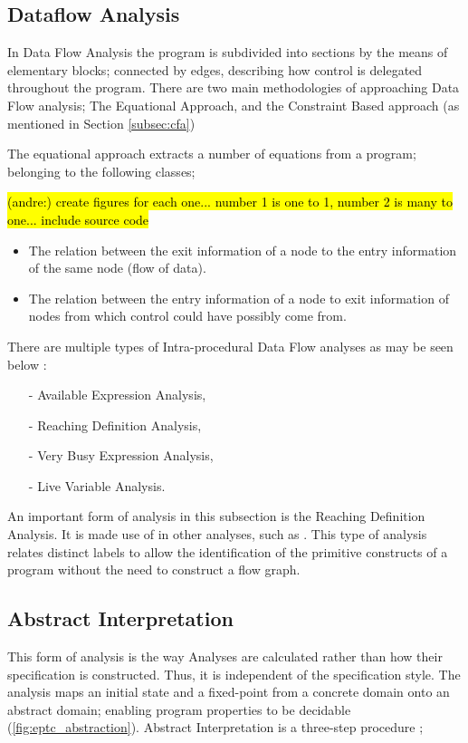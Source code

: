 \documentclass[12pt, a4paper]{report}
\DeclareRobustCommand{\andre}[1]{ {\begingroup\sethlcolor{BurntOrange}\hl{(andre:) #1}\endgroup} }
\theoremstyle{definition}
\theoremstyle{definition}%
\theoremstyle{definition}%
\theoremstyle{definition}%
\theoremstyle{definition}%
\theoremstyle{definition}%
\begin{document}
{    \subsection{Dataflow Analysis}
    \par In Data Flow Analysis the program is subdivided into sections by the means of elementary blocks; connected by edges, describing how control is delegated throughout the program.
    There are two main methodologies of approaching Data Flow analysis; The Equational Approach, and the Constraint Based approach (as mentioned in Section \ref{subsec:cfa})
    \par The equational approach extracts a number of equations from a program; belonging to the following classes;
    
    \par \andre{create figures for each one... number 1 is one to 1, number 2 is many to one... include source code}
    \begin{itemize}
        \item The relation between the exit information of a node to the entry information of the same node (flow of data).
        \item The relation between the entry information of a node to exit information of nodes from which control could have possibly come from. 
    \end{itemize}

    \par There are multiple types of Intra-procedural Data Flow analyses as may be seen below \cite[pp.33--51]{nielson2004principlesofPA}:
    \begin{itemize}
        \item[-] Available Expression Analysis,
        \item[-] Reaching Definition Analysis,
        \item[-] Very Busy Expression Analysis,
        \item[-] Live Variable Analysis.
    \end{itemize}

    \par An important form of analysis in this subsection is the Reaching Definition Analysis. It is made use of in other analyses, such as .
    This type of analysis relates distinct labels to allow the identification of the primitive constructs of a program without the need to construct a flow graph.

    \subsection{Abstract Interpretation}
    \label{subsec:abstractinterp}
    \par This form of analysis is the way Analyses are calculated rather than how their specification is constructed. Thus, it is independent of the specification style.
    The analysis maps an initial state and a fixed-point from a concrete domain onto an abstract domain; enabling program properties to be decidable (\ref{fig:eptc_abstraction}). Abstract Interpretation is a three-step procedure \cite[pp.13--17]{nielson2004principlesofPA};

}
\end{document}
